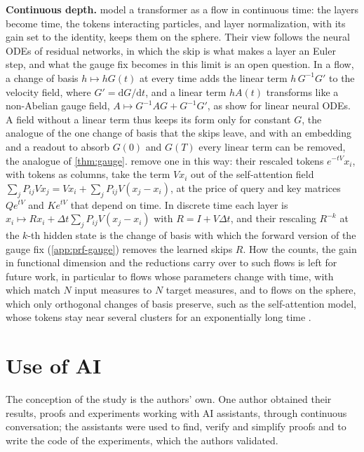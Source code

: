 \documentclass[10pt]{article}
\theoremstyle{definition}
\theoremstyle{remark}
\newcommand{\para}[1]{\smallskip\noindent\textbf{#1}\hspace{0.5em}}
\begin{document}
\para{Continuous depth.} \citet{geshkovski2025transformers} model a transformer as a flow in continuous time: the layers become time, the tokens interacting particles, and layer normalization, with its gain set to the identity, keeps them on the sphere. Their view follows the neural ODEs of residual networks, in which the skip is what makes a layer an Euler step, and what the gauge fix becomes in this limit is an open question. In a flow, a change of basis $h \mapsto hG(t)$ at every time adds the linear term $h\,G^{-1}G'$ to the velocity field, where $G' = \mathrm{d}G/\mathrm{d}t$, and a linear term $hA(t)$ transforms like a non-Abelian gauge field, $A \mapsto G^{-1}AG + G^{-1}G'$, as \citet{hashimoto2024unification} show for linear neural ODEs. A field without a linear term thus keeps its form only for constant $G$, the analogue of the one change of basis that the skips leave, and with an embedding and a readout to absorb $G(0)$ and $G(T)$ every linear term can be removed, the analogue of \cref{thm:gauge}. \citet{geshkovski2023clusters} remove one in this way: their rescaled tokens $e^{-tV}x_i$, with tokens as columns, take the term $Vx_i$ out of the self-attention field $\sum_j P_{ij}Vx_j = Vx_i + \sum_j P_{ij}V(x_j - x_i)$, at the price of query and key matrices $Qe^{tV}$ and $Ke^{tV}$ that depend on time. In discrete time each layer is $x_i \mapsto Rx_i + \Delta t\sum_j P_{ij}V(x_j - x_i)$ with $R = I + V\Delta t$, and their rescaling $R^{-k}$ at the $k$-th hidden state \citep[Remark~3.4]{geshkovski2023clusters} is the change of basis with which the forward version of the gauge fix (\cref{app:prf-gauge}) removes the learned skips $R$. How the counts, the gain in functional dimension and the reductions carry over to such flows is left for future work, in particular to flows whose parameters change with time, with which \citet{geshkovski2026measure} match $N$ input measures to $N$ target measures, and to flows on the sphere, which only orthogonal changes of basis preserve, such as the self-attention model, whose tokens stay near several clusters for an exponentially long time \citep{geshkovski2024metastability}.

\section*{Use of AI}
The conception of the study is the authors' own. One author obtained their results, proofs and experiments working with AI assistants, through continuous conversation; the assistants were used to find, verify and simplify proofs and to write the code of the experiments, which the authors validated.
\end{document}
